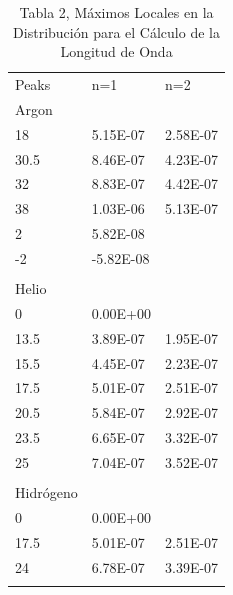 \documentclass[a4paper,twocolumn,10pt]{article}
\begin{document}
\begin{table}[H]
\centering
\caption{Tabla 2, Máximos Locales en la Distribución para el Cálculo de la Longitud de Onda}
\begin{tabular}{lll}
\rowcolor[rgb]{0,1,0.914} Peaks         & n=1       & n=2       \\
\rowcolor[rgb]{0,1,0.914} Argon         &           &           \\
18                                      & 5.15E-07  & 2.58E-07  \\
30.5                                    & 8.46E-07  & 4.23E-07  \\
32                                      & 8.83E-07  & 4.42E-07  \\
38                                      & 1.03E-06  & 5.13E-07  \\
2                                       & 5.82E-08  &           \\
-2                                      & -5.82E-08 &           \\
                                        &           &           \\
\rowcolor[rgb]{0,1,0.914} Helio         &           &           \\
0                                       & 0.00E+00  &           \\
13.5                                    & 3.89E-07  & 1.95E-07  \\
15.5                                    & 4.45E-07  & 2.23E-07  \\
17.5                                    & 5.01E-07  & 2.51E-07  \\
20.5                                    & 5.84E-07  & 2.92E-07  \\
23.5                                    & 6.65E-07  & 3.32E-07  \\
25                                      & 7.04E-07  & 3.52E-07  \\
                                        &           &           \\
\rowcolor[rgb]{0,1,0.914} Hidrógeno     &           &           \\
0                                       & 0.00E+00  &           \\
17.5                                    & 5.01E-07  & 2.51E-07  \\
24                                      & 6.78E-07  & 3.39E-07  \\
                                        &           &           \\

\end{tabular}
\end{table}
\end{document}

